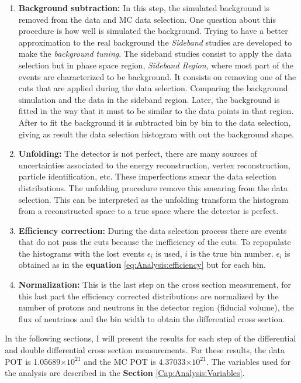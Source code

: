 \begin{enumerate}
    \item \textbf{Background subtraction:} In this step, the simulated background is removed from the data and MC data selection. One question about this procedure is how well is simulated the background. Trying to have a better approximation to the real background the \textit{Sideband} studies are developed to make the \textit{background tuning}. The sideband studies consist to apply the data selection but in phase space region, \textit{Sideband Region}, where most part of the events are characterized to be background. It consists on removing one of the cuts that are applied during the data selection. Comparing the background simulation and the data in the sideband region. Later, the background is fitted in the way that it must to be similar to the data points in that region. After to fit the background it is subtracted bin by bin to the data selection, giving as result the data selection histogram with out the background shape. 

    \item \textbf{Unfolding:} The detector is not perfect, there are many sources of uncertainties associated to the energy reconstruction, vertex reconstruction, particle identification, etc. These imperfections smear the data selection distributions. The unfolding procedure remove this smearing from the data selection. This can be interpreted as the unfolding transform the histogram from a reconstructed space to a true space where the detector is perfect. 

    \item \textbf{Efficiency correction:} During the data selection process there are events that do not pass the cuts because the inefficiency of the cuts. To repopulate the histograms with the lost events $\epsilon_i$ is used, $i$ is the true bin number. $\epsilon_i$ is obtained as in the \textbf{equation} \ref{eq:Analysis:efficiency} but for each bin. 

    \item \textbf{Normalization:} This is the last step on the cross section measurement, for this last part the efficiency corrected distributions are normalized by the number of protons and neutrons in the detector region (fiducial volume), the flux of neutrinos and the bin width to obtain the differential cross section. 
    
\end{enumerate}

    In the following sections, I will present the results for each step of the differential and double differential cross section measurements. For these results, the data POT is 1.05689$\times 10^{21}$ and the MC POT is 4.37033$\times 10^{21}$.  The variables used for the analysis are described in the \textbf{Section} \ref{Cap:Analysis:Variables}.


